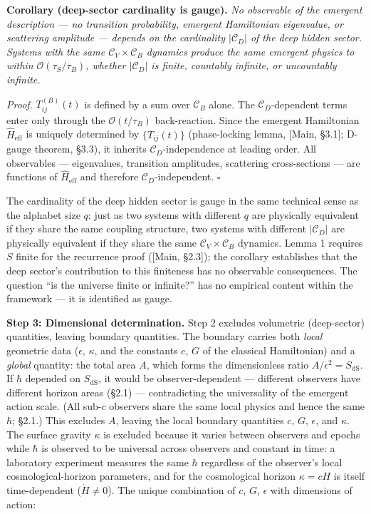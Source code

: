 \documentclass[
]{article}
\begin{document}
\textbf{Corollary (deep-sector cardinality is gauge).} \emph{No
observable of the emergent description --- no transition probability,
emergent Hamiltonian eigenvalue, or scattering amplitude --- depends on
the cardinality \(|\mathcal{C}_D|\) of the deep hidden sector. Systems
with the same \(\mathcal{C}_V \times \mathcal{C}_B\) dynamics produce
the same emergent physics to within \(\mathcal{O}(\tau_S/\tau_B)\),
whether \(|\mathcal{C}_D|\) is finite, countably infinite, or
uncountably infinite.}

\emph{Proof.} \(T^{(B)}_{ij}(t)\) is defined by a sum over
\(\mathcal{C}_B\) alone. The \(\mathcal{C}_D\)-dependent terms enter
only through the \(\mathcal{O}(t/\tau_B)\) back-reaction. Since the
emergent Hamiltonian \(\hat{H}_{\text{eff}}\) is uniquely determined by
\(\{T_{ij}(t)\}\) (phase-locking lemma, {[}Main, §3.1{]}; D-gauge
theorem, §3.3), it inherits \(\mathcal{C}_D\)-independence at leading
order. All observables --- eigenvalues, transition amplitudes,
scattering cross-sections --- are functions of \(\hat{H}_{\text{eff}}\)
and therefore \(\mathcal{C}_D\)-independent. \(\square\)

The cardinality of the deep hidden sector is gauge in the same technical
sense as the alphabet size \(q\): just as two systems with different
\(q\) are physically equivalent if they share the same coupling
structure, two systems with different \(|\mathcal{C}_D|\) are physically
equivalent if they share the same \(\mathcal{C}_V \times \mathcal{C}_B\)
dynamics. Lemma 1 requires \(S\) finite for the recurrence proof
({[}Main, §2.3{]}); the corollary establishes that the deep sector's
contribution to this finiteness has no observable consequences. The
question ``is the universe finite or infinite?'' has no empirical
content within the framework --- it is identified as gauge.

\textbf{Step 3: Dimensional determination.} Step 2 excludes volumetric
(deep-sector) quantities, leaving boundary quantities. The boundary
carries both \emph{local} geometric data (\(\epsilon\), \(\kappa\), and
the constants \(c\), \(G\) of the classical Hamiltonian) and a
\emph{global} quantity: the total area \(A\), which forms the
dimensionless ratio \(A/\epsilon^2 = S_{\text{dS}}\). If \(\hbar\)
depended on \(S_{\text{dS}}\), it would be observer-dependent ---
different observers have different horizon areas (§2.1) ---
contradicting the universality of the emergent action scale. (All
sub-\(c\) observers share the same local physics and hence the same
\(\hbar\); §2.1.) This excludes \(A\), leaving the local boundary
quantities \(c\), \(G\), \(\epsilon\), and \(\kappa\). The surface
gravity \(\kappa\) is excluded because it varies between observers and
epochs while \(\hbar\) is observed to be universal across observers and
constant in time: a laboratory experiment measures the same \(\hbar\)
regardless of the observer's local cosmological-horizon parameters, and
for the cosmological horizon \(\kappa = cH\) is itself time-dependent
(\(\dot{H} \neq 0\)). The unique combination of \(c\), \(G\),
\(\epsilon\) with dimensions of action:
\end{document}
